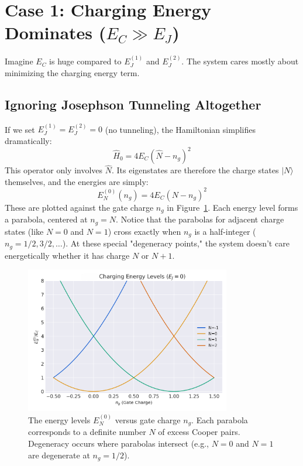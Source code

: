 \documentclass{book}
\begin{document}
\section[Case 1: Charging Energy Dominates]{Case 1: Charging Energy Dominates (\(E_C \gg E_J\))}
\label{sec:charge_regime}

Imagine \(E_C\) is huge compared to \(E_J^{(1)}\) and \(E_J^{(2)}\). The system cares mostly about minimizing the charging energy term.

\subsection{Ignoring Josephson Tunneling Altogether}
\label{subsec:pure_charging}

If we set \(E_J^{(1)} = E_J^{(2)} = 0\) (no tunneling), the Hamiltonian simplifies dramatically:
\begin{equation}
\hat{H}_0 = 4 E_C (\hat{N} - n_g)^2
\end{equation}
This operator only involves \(\hat{N}\). Its eigenstates are therefore the charge states \(|N\rangle\) themselves, and the energies are simply:
\begin{equation}
E_N^{(0)}(n_g) = 4 E_C (N - n_g)^2
\label{eq:E_N_0}
\end{equation}
These are plotted against the gate charge \(n_g\) in Figure~\ref{fig:charging_levels}. Each energy level forms a parabola, centered at \(n_g = N\). Notice that the parabolas for adjacent charge states (like \(N=0\) and \(N=1\)) cross exactly when \(n_g\) is a half-integer (\(n_g = 1/2, 3/2, \dots\)). At these special "degeneracy points," the system doesn't care energetically whether it has charge \(N\) or \(N+1\).

\begin{figure}[ht]
    \centering
    \includegraphics[width=0.8\textwidth]{fig_charge_levels.png}
    \caption[Charging energy levels vs. gate charge]{The energy levels \(E_N^{(0)}\) versus gate charge \(n_g\). Each parabola corresponds to a definite number \(N\) of excess Cooper pairs. Degeneracy occurs where parabolas intersect (e.g., \(N=0\) and \(N=1\) are degenerate at \(n_g=1/2\)).}
    \label{fig:charging_levels}
\end{figure}
\end{document}
